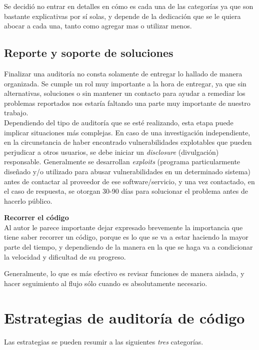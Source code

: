 Se decidió no entrar en detalles en cómo es cada una de las categorías ya que son bastante explicativas por sí solas, y depende de la dedicación que se le quiera abocar a cada una, tanto como agregar mas o utilizar menos.

\subsection{Reporte y soporte de soluciones}
Finalizar una auditoría no consta solamente de entregar lo hallado de manera organizada. Se cumple un rol muy importante a la hora de entregar, ya que sin alternativas, soluciones o sin mantener un contacto para ayudar a remediar los problemas reportados nos estaría faltando una parte muy importante de nuestro trabajo.\\

Dependiendo del tipo de auditoría que se esté realizando, esta etapa puede implicar situaciones más complejas. En caso de una investigación independiente, en la circunstancia de haber encontrado vulnerabilidades explotables que pueden perjudicar a otros usuarios, se debe iniciar un \textit{disclosure} (divulgación) responsable. Generalmente se desarrollan \textit{exploits} (programa particularmente diseñado y/o utilizado para abusar vulnerabilidades en un determinado sistema) antes de contactar al proveedor de ese software/servicio, y una vez contactado, en el caso de respuesta, se otorgan 30-90 días para solucionar el problema antes de hacerlo público.\\

\begin{notesBox}
    \textbf{Recorrer el código}\\
    Al autor le parece importante dejar expresado brevemente la importancia que tiene saber recorrer un código, porque es lo que se va a estar haciendo la mayor parte del tiempo, y dependiendo de la manera en la que se haga va a condicionar la velocidad y dificultad de su progreso.

    Generalmente, lo que es más efectivo es revisar funciones de manera aislada, y hacer seguimiento al flujo sólo cuando es absolutamente necesario.

\end{notesBox}

\section{Estrategias de auditoría de código}
Las estrategias se pueden resumir a las siguientes \textit{tres} categorías.

